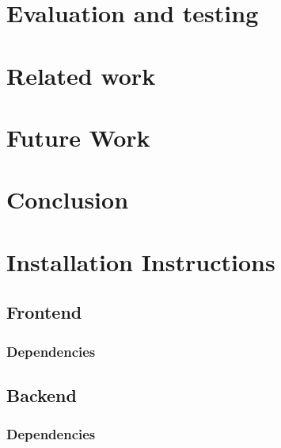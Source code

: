 \documentclass[11pt]{report}
\begin{document}



\chapter{Evaluation and testing}
\chapter{Related work}
\chapter{Future Work}
\chapter{Conclusion}
\chapter{Installation Instructions}
\section {Frontend}
\subsection {Dependencies}
\section {Backend}
\subsection {Dependencies}
\end{document}
